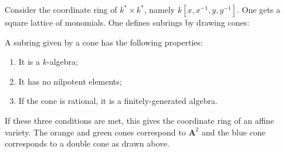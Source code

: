 \documentclass [11 pt, oneside, margin = 1 in] {article}
\begin{document}
\begin{example}\label{}\text{}
Consider the coordinate ring of $k^*\times k^*$, namely $k[x,x^{-1},y,y^{-1}]$. One gets a square lattice of monomials. One defines subrings by drawing cones:
\begin{center}
\end{center}
A subring given by a cone has the following properties:
\begin{enumerate}
	\item It is a $k$-algebra;
	\item It has no nilpotent elements;
	\item If the cone is rational, it is a finitely-generated algebra.
\end{enumerate}
If these three conditions are met, this gives the coordinate ring of an affine variety. The orange and green cones correspond to $\mathbf{A}^2$ and the blue cone corresponds to a double cone as drawn above. 


\end{example}
\end{document}
